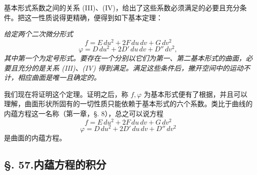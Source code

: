 基本形式系数之间的关系 (III)、(IV)，给出了这些系数必须满足的必要且充分条件。把这一性质说得更精确，便得到如下基本定理：

\emph{给定两个二次微分形式}
\[
 f=E\,du^2+2F\,du\,dv+G\,dv^2
\]
\[
 \varphi=D\,du^2+2D'\,du\,dv+D''\,dv^2,
\]
\emph{其中第一个为定号形式。要存在一个分别以它们为第一、第二基本形式的曲面，必要且充分的是关系 (III)、(IV) 得到满足。满足这些条件后，撇开空间中的运动不计，相应曲面是唯一且确定的。}

我们现在将证明这个定理。证明之后，称 \(f,\varphi\) 为基本形式便有了根据，并且可以理解，曲面形状所固有的一切性质只能依赖于基本形式的六个系数。类比于曲线的内蕴方程这一名称（第一章，\S. 8），总之可以说方程
\[
 f=E\,du^2+2F\,du\,dv+G\,dv^2
\]
\[
 \varphi=D\,du^2+2D'\,du\,dv+D''\,dv^2
\]
是曲面的内蕴方程。

\subsection*{\S. 57.\quad 内蕴方程的积分}

